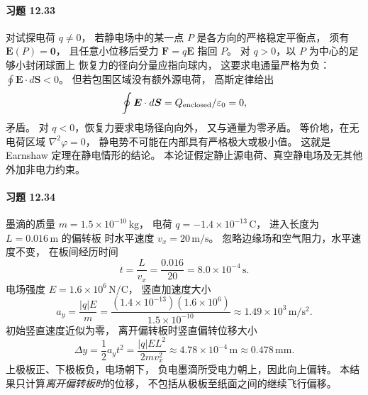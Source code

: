 \paragraph{习题 12.33}
对试探电荷 \(q\ne0\)，
若静电场中的某一点 \(P\) 是各方向的严格稳定平衡点，
须有 \(\boldsymbol E(P)=\boldsymbol0\)，
且任意小位移后受力 \(\boldsymbol F=q\boldsymbol E\)
指回 \(P\)。
对 \(q>0\)，以 \(P\) 为中心的足够小封闭球面上
恢复力的径向分量应指向球内，
这要求电通量严格为负：
\(\oint\boldsymbol E\cdot d\boldsymbol S<0\)。
但若包围区域没有额外源电荷，
高斯定律给出
\[
 \oint\boldsymbol E\cdot d\boldsymbol S
 =Q_{\rm enclosed}/\varepsilon_0=0,
\]
矛盾。
对 \(q<0\)，恢复力要求电场径向向外，
又与通量为零矛盾。
等价地，在无电荷区域
\(\nabla^2\varphi=0\)，
静电势不可能在内部具有严格极大或极小值。
这就是 Earnshaw 定理在静电情形的结论。
本论证假定静止源电荷、真空静电场及无其他外加非电力约束。

\paragraph{习题 12.34}
墨滴的质量 \(m=1.5\times10^{-10}\,\mathrm{kg}\)，
电荷 \(q=-1.4\times10^{-13}\,\mathrm C\)，
进入长度为 \(L=0.016\,\mathrm m\) 的偏转板
时水平速度 \(v_x=20\,\mathrm{m/s}\)。
忽略边缘场和空气阻力，水平速度不变，
在板间经历时间
\[
 t=\frac L{v_x}=\frac{0.016}{20}
 =8.0\times10^{-4}\,\mathrm s.
\]
电场强度 \(E=1.6\times10^6\,\mathrm{N/C}\)，
竖直加速度大小
\[
 a_y=\frac{|q|E}{m}
 =\frac{(1.4\times10^{-13})(1.6\times10^6)}
 {1.5\times10^{-10}}
 \approx1.49\times10^3\,\mathrm{m/s^2}.
\]
初始竖直速度近似为零，
离开偏转板时竖直偏转位移大小
\[
 \boxed{\Delta y=\frac12a_yt^2
 =\frac{|q|EL^2}{2mv_x^2}
 \approx4.78\times10^{-4}\,\mathrm m
 \approx0.478\,\mathrm{mm}}.
\]
上极板正、下极板负，电场朝下，
负电墨滴所受电力朝上，因此向上偏转。
本结果只计算\emph{离开偏转板时}的位移，
不包括从极板至纸面之间的继续飞行偏移。
